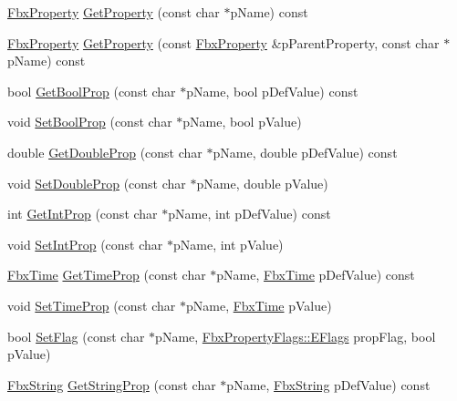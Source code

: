 \begin{DoxyCompactItemize}
\hyperlink{class_fbx_property}{Fbx\+Property} \hyperlink{class_fbx_i_o_settings_aa02805702152a4ef56d337c25b12d42b}{Get\+Property} (const char $\ast$p\+Name) const
\item 
\hyperlink{class_fbx_property}{Fbx\+Property} \hyperlink{class_fbx_i_o_settings_aedc91a76523e1fb2fe015901afd5d8bc}{Get\+Property} (const \hyperlink{class_fbx_property}{Fbx\+Property} \&p\+Parent\+Property, const char $\ast$p\+Name) const
\item 
bool \hyperlink{class_fbx_i_o_settings_aa30a3e515f60aa1fcbd82b6b34994ad0}{Get\+Bool\+Prop} (const char $\ast$p\+Name, bool p\+Def\+Value) const
\item 
void \hyperlink{class_fbx_i_o_settings_ad2c660ef846b66dcf569079299391745}{Set\+Bool\+Prop} (const char $\ast$p\+Name, bool p\+Value)
\item 
double \hyperlink{class_fbx_i_o_settings_a4d068caa98d8183a45b520d6ade6ad41}{Get\+Double\+Prop} (const char $\ast$p\+Name, double p\+Def\+Value) const
\item 
void \hyperlink{class_fbx_i_o_settings_ae97bbc6c4ae0534788dba82e3cfd0c4f}{Set\+Double\+Prop} (const char $\ast$p\+Name, double p\+Value)
\item 
int \hyperlink{class_fbx_i_o_settings_a3ab14ccc4a1ecb92bc94c61597d50d08}{Get\+Int\+Prop} (const char $\ast$p\+Name, int p\+Def\+Value) const
\item 
void \hyperlink{class_fbx_i_o_settings_a5284810e44344eb94b1dcdd97af4a8a3}{Set\+Int\+Prop} (const char $\ast$p\+Name, int p\+Value)
\item 
\hyperlink{class_fbx_time}{Fbx\+Time} \hyperlink{class_fbx_i_o_settings_a369d87d5f1785484917a44abd5f70bd3}{Get\+Time\+Prop} (const char $\ast$p\+Name, \hyperlink{class_fbx_time}{Fbx\+Time} p\+Def\+Value) const
\item 
void \hyperlink{class_fbx_i_o_settings_a780a8567ad7916be8914e9a22c09f1a5}{Set\+Time\+Prop} (const char $\ast$p\+Name, \hyperlink{class_fbx_time}{Fbx\+Time} p\+Value)
\item 
bool \hyperlink{class_fbx_i_o_settings_a3a729325e682c916226227e4ebcebd58}{Set\+Flag} (const char $\ast$p\+Name, \hyperlink{class_fbx_property_flags_afabfa7e0949aac8a7dcdf8a141867e99}{Fbx\+Property\+Flags\+::\+E\+Flags} prop\+Flag, bool p\+Value)
\item 
\hyperlink{class_fbx_string}{Fbx\+String} \hyperlink{class_fbx_i_o_settings_ab3e057be50be4fbeae6e70ceb38cf1fa}{Get\+String\+Prop} (const char $\ast$p\+Name, \hyperlink{class_fbx_string}{Fbx\+String} p\+Def\+Value) const
\item 

\end{DoxyCompactItemize}
